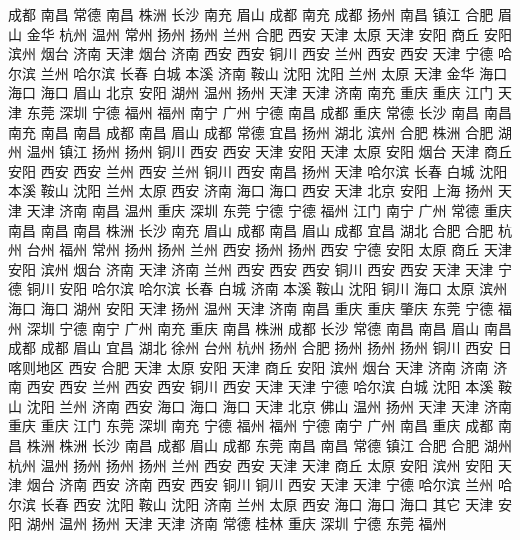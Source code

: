 成都
南昌
常德
南昌
株洲
长沙
南充
眉山
成都
南充
成都
扬州
南昌
镇江
合肥
眉山
金华
杭州
温州
常州
扬州
扬州
兰州
合肥
西安
天津
太原
天津
安阳
商丘
安阳
滨州
烟台
济南
天津
烟台
济南
西安
西安
铜川
西安
兰州
西安
西安
天津
宁德
哈尔滨
兰州
哈尔滨
长春
白城
本溪
济南
鞍山
沈阳
沈阳
兰州
太原
天津
金华
海口
海口
海口
眉山
北京
安阳
湖州
温州
扬州
天津
天津
济南
南充
重庆
重庆
江门
天津
东莞
深圳
宁德
福州
福州
南宁
广州
宁德
南昌
成都
重庆
常德
长沙
南昌
南昌
南充
南昌
南昌
成都
南昌
眉山
成都
常德
宜昌
扬州
湖北
滨州
合肥
株洲
合肥
湖州
温州
镇江
扬州
扬州
铜川
西安
西安
天津
安阳
天津
太原
安阳
烟台
天津
商丘
安阳
西安
西安
兰州
西安
兰州
铜川
西安
南昌
扬州
天津
哈尔滨
长春
白城
沈阳
本溪
鞍山
沈阳
兰州
太原
西安
济南
海口
海口
西安
天津
北京
安阳
上海
扬州
天津
天津
济南
南昌
温州
重庆
深圳
东莞
宁德
宁德
福州
江门
南宁
广州
常德
重庆
南昌
南昌
南昌
株洲
长沙
南充
眉山
成都
南昌
眉山
成都
宜昌
湖北
合肥
合肥
杭州
台州
福州
常州
扬州
扬州
兰州
西安
扬州
扬州
西安
宁德
安阳
太原
商丘
天津
安阳
滨州
烟台
济南
天津
济南
兰州
西安
西安
西安
铜川
西安
西安
天津
天津
宁德
铜川
安阳
哈尔滨
哈尔滨
长春
白城
济南
本溪
鞍山
沈阳
铜川
海口
太原
滨州
海口
海口
湖州
安阳
天津
扬州
温州
天津
济南
南昌
重庆
重庆
肇庆
东莞
宁德
福州
深圳
宁德
南宁
广州
南充
重庆
南昌
株洲
成都
长沙
常德
南昌
南昌
眉山
南昌
成都
成都
眉山
宜昌
湖北
徐州
台州
杭州
扬州
合肥
扬州
扬州
扬州
铜川
西安
日喀则地区
西安
合肥
天津
太原
安阳
天津
商丘
安阳
滨州
烟台
天津
济南
济南
济南
西安
西安
兰州
西安
西安
铜川
西安
天津
天津
宁德
哈尔滨
白城
沈阳
本溪
鞍山
沈阳
兰州
济南
西安
海口
海口
海口
天津
北京
佛山
温州
扬州
天津
天津
济南
重庆
重庆
江门
东莞
深圳
南充
宁德
福州
福州
宁德
南宁
广州
南昌
重庆
成都
南昌
株洲
株洲
长沙
南昌
成都
眉山
成都
东莞
南昌
南昌
常德
镇江
合肥
合肥
湖州
杭州
温州
扬州
扬州
扬州
兰州
西安
西安
天津
天津
商丘
太原
安阳
滨州
安阳
天津
烟台
济南
西安
济南
西安
西安
铜川
铜川
西安
天津
天津
宁德
哈尔滨
兰州
哈尔滨
长春
西安
沈阳
鞍山
沈阳
济南
兰州
太原
西安
海口
海口
海口
其它
天津
安阳
湖州
温州
扬州
天津
天津
济南
常德
桂林
重庆
深圳
宁德
东莞
福州
